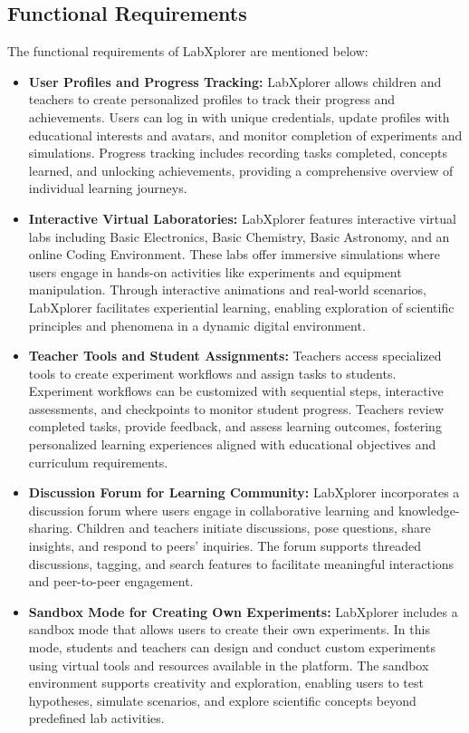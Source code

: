 \subsection{Functional Requirements}
The functional requirements of LabXplorer are mentioned below:
\begin{itemize}
    \item \textbf{User Profiles and Progress Tracking:} LabXplorer allows children and teachers to create personalized profiles to track their progress and achievements. Users can log in with unique credentials, update profiles with educational interests and avatars, and monitor completion of experiments and simulations. Progress tracking includes recording tasks completed, concepts learned, and unlocking achievements, providing a comprehensive overview of individual learning journeys.
    \item \textbf{Interactive Virtual Laboratories:} LabXplorer features interactive virtual labs including Basic Electronics, Basic Chemistry, Basic Astronomy, and an online Coding Environment. These labs offer immersive simulations where users engage in hands-on activities like experiments and equipment manipulation. Through interactive animations and real-world scenarios, LabXplorer facilitates experiential learning, enabling exploration of scientific principles and phenomena in a dynamic digital environment.
    \item \textbf{Teacher Tools and Student Assignments:} Teachers access specialized tools to create experiment workflows and assign tasks to students. Experiment workflows can be customized with sequential steps, interactive assessments, and checkpoints to monitor student progress. Teachers review completed tasks, provide feedback, and assess learning outcomes, fostering personalized learning experiences aligned with educational objectives and curriculum requirements.
    \item \textbf{Discussion Forum for Learning Community:} LabXplorer incorporates a discussion forum where users engage in collaborative learning and knowledge-sharing. Children and teachers initiate discussions, pose questions, share insights, and respond to peers' inquiries. The forum supports threaded discussions, tagging, and search features to facilitate meaningful interactions and peer-to-peer engagement. 
    \item \textbf{Sandbox Mode for Creating Own Experiments:} LabXplorer includes a sandbox mode that allows users to create their own experiments. In this mode, students and teachers can design and conduct custom experiments using virtual tools and resources available in the platform. The sandbox environment supports creativity and exploration, enabling users to test hypotheses, simulate scenarios, and explore scientific concepts beyond predefined lab activities. 
\end{itemize}
\newpage
